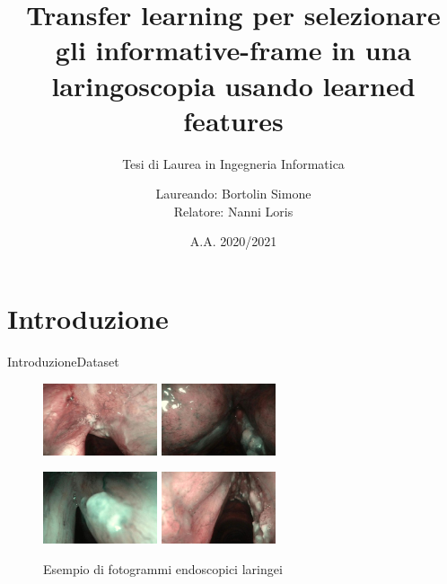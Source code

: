 \documentclass[aspectratio=169]{beamer}
\title{Transfer learning per selezionare gli informative-frame in una laringoscopia usando learned features}
\subtitle{Tesi di Laurea in Ingegneria Informatica}
\date{A.A. 2020/2021}
\author{Laureando: Bortolin Simone\\Relatore: Nanni Loris}
\begin{document}
\begin{frame}
    \maketitle
\end{frame}

\begin{frame}
            \tableofcontents
\end{frame}
\section{Introduzione}
\begin{frame}{Introduzione}{Dataset}
    
    \begin{figure}[ht]
        \centering
        \includegraphics[width=0.3\textwidth]{introduzione/Larynge-1.jpg}
        \includegraphics[width=0.3\textwidth]{introduzione/Larynge-2.jpg}
    
        \includegraphics[width=0.3\textwidth]
        {introduzione/Larynge-3.jpg}
        \includegraphics[width=0.3\textwidth]{introduzione/Larynge-4.jpg}
        \caption{Esempio di fotogrammi endoscopici laringei}
        \label{fig:larynges}
    \end{figure}
\end{frame}
\end{document}
